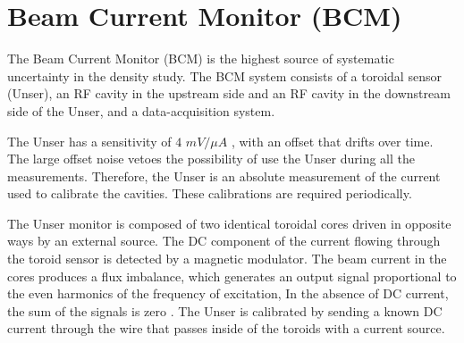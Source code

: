 \documentclass[preprint,12pt]{elsarticle}
\begin{document}
\section{Beam Current Monitor (BCM)}

The Beam Current Monitor (BCM) is the highest source of systematic uncertainty in the density study. The BCM system consists of a toroidal sensor (Unser), an RF cavity in the upstream side and an RF cavity in the downstream side of the Unser, and a data-acquisition system.  

The Unser has a sensitivity of $4$ $mV/\mu A$ \cite{denard}, with an offset that drifts over time. The large offset noise vetoes the possibility of use the Unser during all the measurements. Therefore, the Unser is an absolute measurement of the current used to calibrate the cavities. These calibrations are required periodically.

The Unser monitor is composed of two identical toroidal cores driven in opposite ways by an external source.  The DC component of the current flowing through the toroid sensor is detected by a magnetic modulator. The beam current in the cores produces a flux imbalance, which generates an output signal proportional to the even harmonics of the frequency of excitation, In the absence of DC current, the sum of the signals is zero \cite{denard}. The Unser is calibrated by sending a known DC current through the wire that passes inside of the toroids with a current source.  
\end{document}
